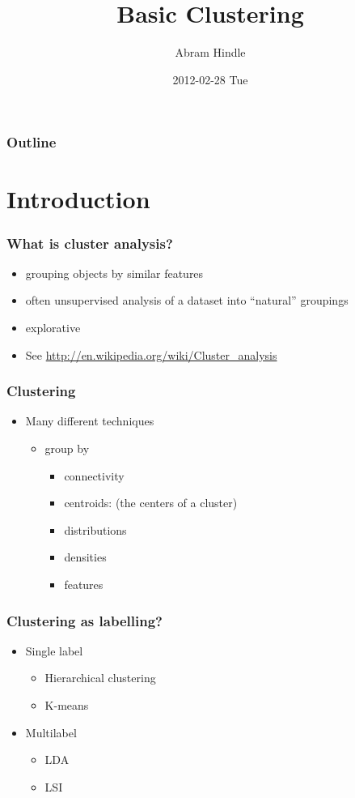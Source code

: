 \documentclass[bigger]{beamer}
\title{Basic Clustering}
\author{Abram Hindle}
\date{2012-02-28 Tue}
\begin{document}
\maketitle

\begin{frame}
\frametitle{Outline}
\setcounter{tocdepth}{3}
\tableofcontents
\end{frame}




\section{Introduction}
\label{sec-1}
\begin{frame}
\frametitle{What is cluster analysis?}
\label{sec-1-1}


\begin{itemize}
\item grouping objects by similar features
\item often unsupervised analysis of a dataset into ``natural'' groupings
\item explorative
\item See \href{http://en.wikipedia.org/wiki/Cluster_analysis}{http://en.wikipedia.org/wiki/Cluster\_analysis}
\end{itemize}
\end{frame}
\begin{frame}
\frametitle{Clustering}
\label{sec-1-2}


\begin{itemize}
\item Many different techniques
\begin{itemize}
\item group by
\begin{itemize}
\item connectivity
\item centroids: (the centers of a cluster)
\item distributions
\item densities
\item features
\end{itemize}
\end{itemize}
\end{itemize}
\end{frame}
\begin{frame}
\frametitle{Clustering as labelling?}
\label{sec-1-3}


\begin{itemize}
\item Single label
\begin{itemize}
\item Hierarchical clustering
\item K-means
\end{itemize}
\item Multilabel
\begin{itemize}
\item LDA
\item LSI
\end{itemize}
\end{itemize}
\end{frame}
\end{document}
